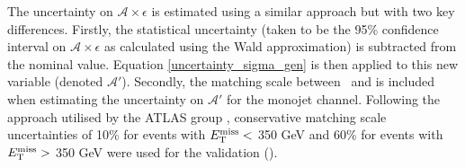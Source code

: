 



The uncertainty on $\mathcal{A} \times \epsilon$ is estimated using a similar approach but with two key differences. Firstly, the statistical uncertainty (taken to be the 95\% confidence interval on $\mathcal{A}\times\epsilon$ as calculated using the Wald approximation) is subtracted from the nominal value. Equation \ref{uncertainty_sigma_gen} is then applied to this new variable (denoted $\mathcal{A}'$). Secondly, the matching scale between \MG\mbox{ }and \PYTHIA is included when estimating the uncertainty on $\mathcal{A}'$ for the monojet channel. Following the approach utilised by the ATLAS group \cite{CERN-THESIS-2015-038}, conservative matching scale uncertainties of 10\% for events with $E_{\mathrm{T}}^{\mathrm{miss}} <$ 350 GeV and 60\% for events with $E_{\mathrm{T}}^{\mathrm{miss}} >$ 350 GeV were used for the validation ().



